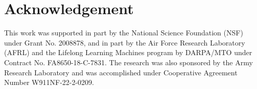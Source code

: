 \documentclass[letterpaper]{article} %
\theoremstyle{plain}
\theoremstyle{definition}
\begin{document}
\section{Acknowledgement}
This work was supported in part by the National Science Foundation (NSF) under Grant No. 2008878, and in part by the Air Force Research Laboratory (AFRL) and the Lifelong Learning Machines program by DARPA/MTO under Contract No. FA8650-18-C-7831. %
The research was also sponsored by the Army Research Laboratory and was accomplished under Cooperative Agreement Number W911NF-22-2-0209. %


\end{document}
